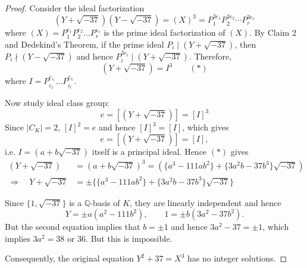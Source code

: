 \begin{proof}
\bigskip
Consider the ideal factorization
$$(Y + \sqrt{-37})(Y - \sqrt{-37}) = (X)^3 = P_1^{3e_1} P_2^{3e_2} \cdots P_r^{3e_r}$$ 
where $(X) = P_1^{e_1} P_2^{e_2}\dots P_r^{e_r}$ is the prime ideal factorization of $(X)$. By Claim 2 and Dedekind's Theorem, if the prime ideal $P_i \mid (Y+\sqrt{-37})$, then
$P_i \nmid (Y-\sqrt{-37})$ and hence $P_i^{3e_i} \mid (Y+\sqrt{-37})$. Therefore,
$$(Y + \sqrt{-37}) = I^3  \quad \quad (*)$$ 
where $I = P_{i_1}^{e_{i_1}}\dots P_{i_l}^{e_{i_l}}$.

Now study ideal class group:
$$e = [(Y + \sqrt{-37})] = [I]^3$$
Since $|C_K| = 2$, $[I]^2 = e$ and hence $[I]^3 = [I]$, which gives
$$e = [(Y + \sqrt{-37})] = [I],$$
i.e. $I = (a+b\sqrt{-37})$ itself is a principal ideal. Hence $(*)$ gives
\begin{align*}
(Y + \sqrt{-37}) &= (a+b\sqrt{-37})^3 = (\{a^3-111ab^2\} + \{3a^2b-37b^3\}\sqrt{-37}) \\ 
\Rightarrow \quad Y + \sqrt{-37} &= \pm\{\{a^3-111ab^2\} + \{3a^2b-37b^3\}\sqrt{-37}\}
\end{align*}

Since $\{1,\sqrt{-37}\}$ is a $\mathbb{Q}$-basis of $K$, they are linearly independent and hence
$$Y = \pm a(a^2-111b^2), \quad \quad  1 = \pm b(3a^2-37b^2).$$
But the second equation implies that $b = \pm 1$ and hence
$3a^2 - 37 = \pm 1$, which implies 
$3a^2 = 38$ or $36$. But this is impossible.

\medskip
Consequently, the original equation $Y^2+37 = X^3$ has no integer solutions.
\end{proof}



